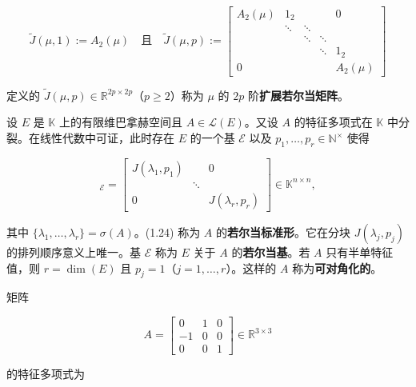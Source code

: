 \begin{remark}
\begin{items}
\begin{equation*}
\widetilde{J}(\mu,1) := A_{2}(\mu) \quad \text{且} \quad \widetilde{J}(\mu,p) := \begin{bmatrix} A_{2}(\mu) & 1_{2} & & & 0 \\ & \ddots & \ddots & & \\ & & \ddots & \ddots & \\ & & & \ddots & 1_{2} \\ 0 & & & & A_{2}(\mu) \end{bmatrix}
\end{equation*}

定义的 $ \widetilde{J}(\mu,p) \in \mathbb{R}^{2p\times 2p} $（$ p \ge 2 $）称为 $ \mu $ 的 $ 2p $ 阶\textbf{扩展若尔当矩阵}。

\item

设 $ E $ 是 $ \mathbb{K} $ 上的有限维巴拿赫空间且 $ A \in \mathcal{L}(E) $。又设 $ A $ 的特征多项式在 $ \mathbb{K} $ 中分裂。在线性代数中可证，此时存在 $ E $ 的一个基 $ \mathcal{E} $ 以及 $ p_{1},\ldots,p_{r} \in \mathbb{N}^{\times} $ 使得

\begin{equation}
[A]_{\mathcal{E}} = \begin{bmatrix} J(\lambda_{1},p_{1}) & & 0 \\ & \ddots & \\ 0 & & J(\lambda_{r},p_{r}) \end{bmatrix} \in \mathbb{K}^{n\times n} ,\tag{1.24}
\end{equation}

其中 $ \{\lambda_{1},\ldots,\lambda_{r}\} = \sigma(A) $。(1.24) 称为 $ A $ 的\textbf{若尔当标准形}。它在分块 $ J(\lambda_{j},p_{j}) $ 的排列顺序意义上唯一。基 $ \mathcal{E} $ 称为 $ E $ 关于 $ A $ 的\textbf{若尔当基}。若 $ A $ 只有半单特征值，则 $ r = \dim(E) $ 且 $ p_{j} = 1 $（$ j = 1,\ldots,r $）。这样的 $ A $ 称为\textbf{可对角化的}。

\item

矩阵

\begin{equation*}
A = \begin{bmatrix} 0 & 1 & 0 \\ -1 & 0 & 0 \\ 0 & 0 & 1 \end{bmatrix} \in \mathbb{R}^{3\times 3}
\end{equation*}

的特征多项式为


\end{items}
\end{remark}
